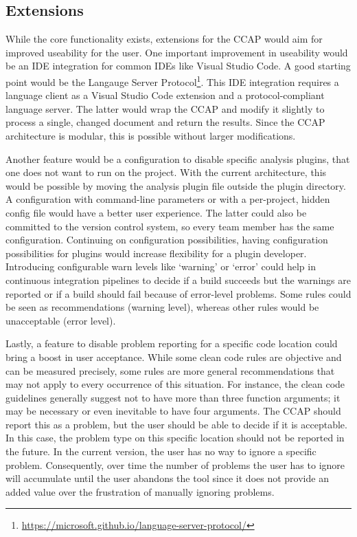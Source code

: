 \subsection{Extensions}
While the core functionality exists, extensions for the CCAP would aim for improved useability for the user. One important improvement in useability would be an IDE integration for common IDEs like Visual Studio Code. A good starting point would be the Langauge Server Protocol\footnote{\url{https://microsoft.github.io/language-server-protocol/}}. This IDE integration requires a language client as a Visual Studio Code extension and a protocol-compliant language server. The latter would wrap the CCAP and modify it slightly to process a single, changed document and return the results. Since the CCAP architecture is modular, this is possible without larger modifications. 

Another feature would be a configuration to disable specific analysis plugins, that one does not want to run on the project. With the current architecture, this would be possible by moving the analysis plugin file outside the plugin directory. A configuration with command-line parameters or with a per-project, hidden config file would have a better user experience. The latter could also be committed to the version control system, so every team member has the same configuration.
Continuing on configuration possibilities, having configuration possibilities for plugins would increase flexibility for a plugin developer. Introducing configurable warn levels like \enquote*{warning} or \enquote*{error} could help in continuous integration pipelines to decide if a build succeeds but the warnings are reported or if a build should fail because of error-level problems. Some rules could be seen as recommendations (warning level), whereas other rules would be unacceptable (error level).

Lastly, a feature to disable problem reporting for a specific code location could bring a boost in user acceptance. While some clean code rules are objective and can be measured precisely, some rules are more general recommendations that may not apply to every occurrence of this situation. For instance, the clean code guidelines generally suggest not to have more than three function arguments; it may be necessary or even inevitable to have four arguments. The CCAP should report this as a problem, but the user should be able to decide if it is acceptable. In this case, the problem type on this specific location should not be reported in the future. In the current version, the user has no way to ignore a specific problem. Consequently, over time the number of problems the user has to ignore will accumulate until the user abandons the tool since it does not provide an added value over the frustration of manually ignoring problems.

